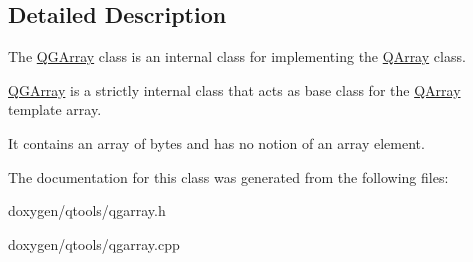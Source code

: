 \subsection{Detailed Description}
The \mbox{\hyperlink{class_q_g_array}{Q\+G\+Array}} class is an internal class for implementing the \mbox{\hyperlink{class_q_array}{Q\+Array}} class. 

\mbox{\hyperlink{class_q_g_array}{Q\+G\+Array}} is a strictly internal class that acts as base class for the \mbox{\hyperlink{class_q_array}{Q\+Array}} template array.

It contains an array of bytes and has no notion of an array element. 

The documentation for this class was generated from the following files\+:\begin{DoxyCompactItemize}
\item 
doxygen/qtools/qgarray.\+h\item 
doxygen/qtools/qgarray.\+cpp\end{DoxyCompactItemize}
